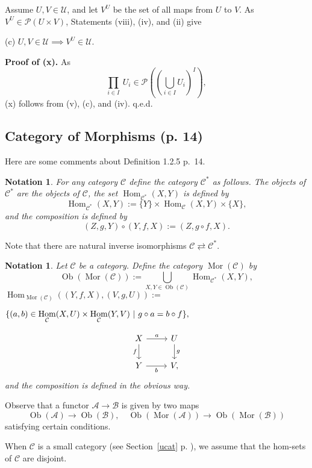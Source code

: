 \documentclass[12pt]{article}
\newtheorem{nota}[thm]{Notation}
\theoremstyle{remark}
\theoremstyle{definition}
\newcommand{\nn}{\noindent}
\newcommand{\A}{\mathcal A}
\newcommand{\B}{\mathcal B}
\newcommand{\C}{\mathcal C}
\DeclareMathOperator{\Hom}{Hom}%
\DeclareMathOperator{\Mor}{Mor}
\DeclareMathOperator{\Ob}{Ob}
\begin{document}
Assume $U,V\in\mathcal U$, and let $V^U$ be the set of all maps from $U$ to $V$. As $V^U\in\mathcal P(U\times V)$, Statements (viii), (iv), and (ii) give

(c) $U,V\in\mathcal U\implies V^U\in\mathcal U$.

\noindent\textbf{Proof of (x).} As 
$$
\prod_{i\in I}\ U_i\in\mathcal P\left(\left(\bigcup_{i\in I}U_i\right)^I\right),
$$
(x) follows from (v), (c), and (iv). q.e.d.
%
%
\subsection{Category of Morphisms (p. 14)}\label{d125}
%
Here are some comments about Definition 1.2.5 p.~14.
%
\begin{nota}\label{c*}
%
For any category $\C$ define the category $\C^*$ as follows. The objects of $\C^*$ are the objects of $\C$, the set $\Hom_{\C^*}(X,Y)$ is defined by 
$$
\Hom_{\C^*}(X,Y):=\{Y\}\times\Hom_{\C}(X,Y)\times\{X\},
$$
and the composition is defined by 
$$
(Z,g,Y)\circ(Y,f,X):=(Z,g\circ f,X).
$$ 
%
\end{nota}
%
Note that there are natural inverse isomorphisms $\C\rightleftarrows\C^*$. 
%
\begin{nota}\label{mor}
%
Let $\C$ be a category. Define the category $\Mor(\C)$ by 
$$
\Ob(\Mor(\C)):=\bigcup_{X,Y\in\Ob(\C)}\Hom_{\C^*}(X,Y),
$$
$\displaystyle \Hom_{\Mor(\C)}((Y,f,X),(V,g,U)):=$\bigskip 

$\hfill\displaystyle\{(a,b)\in\Hom_\C(X,U)\times\Hom_\C(Y,V)\ | \ g\circ a=b\circ f\},$\bigskip

\nn{\em i.e.} 
$$
\begin{tikzcd}
X\ar{d}[swap]{f}\ar{r}{a}&U\ar{d}{g}\\ 
Y\ar{r}[swap]{b}&V,
\end{tikzcd}
$$ 
and the composition is defined in the obvious way.
%
\end{nota}
%
Observe that a functor $\A\to\B$ is given by two maps 
$$
\Ob(\A)\to\Ob(\B),\quad\Ob(\Mor(\A))\to\Ob(\Mor(\B))
$$ 
satisfying certain conditions.

When $\C$ is a small category (see Section~\ref{ucat} p. \pageref{ucat}), we assume that the hom-sets of $\C$ are disjoint.
%
%
\end{document}

